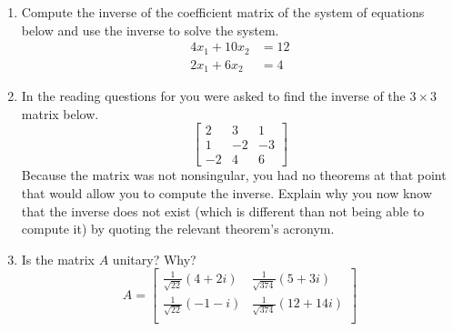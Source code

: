 \begin{enumerate}
%
\item Compute the inverse of the coefficient matrix of the system of
equations below and use the inverse to solve the system.
%
\begin{align*}
4x_1 + 10x_2 &= 12\\
2x_1 + 6x_2 &= 4
\end{align*}
%
\item  In the reading questions for  you were asked to find the  inverse of the $3\times 3$ matrix below.
%
\begin{equation*}
\begin{bmatrix}
2 & 3 & 1\\
1 & -2 & -3\\
-2 & 4 & 6
\end{bmatrix}
\end{equation*}
%
Because the matrix was not nonsingular, you had no theorems at that point that would allow you to compute the inverse.  Explain why you now know that the inverse does not exist (which is different than not being able to compute it) by quoting the relevant theorem's acronym. 
%
\item  Is the matrix $A$ unitary?  Why?
%
\begin{equation*}
A=\begin{bmatrix}
\frac{1}{\sqrt{22}}\left(4+2i\right) & \frac{1}{\sqrt{374}}\left(5+3i\right) \\
\frac{1}{\sqrt{22}}\left(-1-i\right) & \frac{1}{\sqrt{374}}\left(12+14i\right) \\
\end{bmatrix}
\end{equation*}
%
%
\end{enumerate}